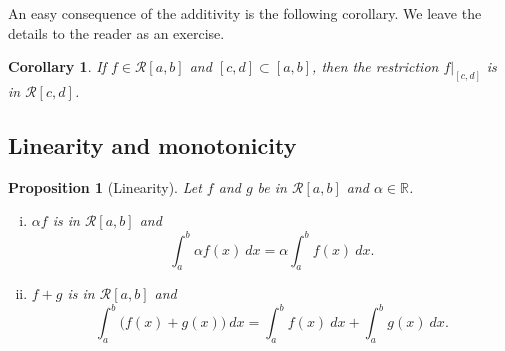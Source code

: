 \documentclass[12pt]{book}
\newcommand{\R}{{\mathbb{R}}}
\newcommand{\sR}{{\mathcal{R}}}
\theoremstyle{plain}
\newtheorem{prop}[thm]{Proposition}
\newtheorem{cor}[thm]{Corollary}
\theoremstyle{remark}
\theoremstyle{definition}
\theoremstyle{exercise}
\theoremstyle{example}
\begin{document}
An easy consequence of the additivity is the following corollary.  We
leave the details to the reader as an exercise.

\begin{cor} \label{intsubcor}
If $f \in \sR[a,b]$ and
$[c,d] \subset [a,b]$, then
the restriction $f|_{[c,d]}$ is in $\sR[c,d]$.
\end{cor}

\subsection{Linearity and monotonicity}

\begin{prop}[Linearity]
Let $f$ and $g$ be in $\sR[a,b]$ and $\alpha \in \R$.
\begin{enumerate}[(i)]
\item $\alpha f$ is in $\sR[a,b]$ and
\begin{equation*}
\int_a^b \alpha f(x) ~dx = \alpha \int_a^b f(x) ~dx .
\end{equation*}
\item $f+g$ is in $\sR[a,b]$ and
\begin{equation*}
\int_a^b \bigl( f(x)+g(x) \bigr) ~dx = 
\int_a^b f(x) ~dx 
+
\int_a^b g(x) ~dx .
\end{equation*}
\end{enumerate}
\end{prop}
\end{document}
